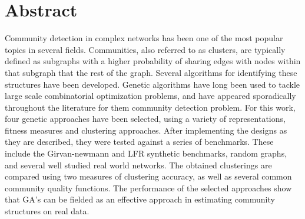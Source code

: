 \thispagestyle{empty}
\section*{Abstract}

\begin{doublespace}
Community detection in complex networks has been one of the most popular topics in several fields. Communities, also referred to as clusters, are typically defined as subgraphs with a higher probability of sharing edges with nodes within that subgraph that the rest of the graph. Several algorithms for identifying these structures have been developed. Genetic algorithms have long been used to tackle large scale combinatorial optimization problems, and have appeared sporadically throughout the literature for them community detection problem. For this work, four genetic approaches have been selected, using a variety of representations, fitness measures and clustering approaches. After implementing the designs as they are described, they were tested against a series of benchmarks. These include the Girvan-newmann and LFR synthetic benchmarks, random graphs, and several well studied real world networks. The obtained clusterings are compared using two measures of clustering accuracy, as well as several common community quality functions. The performance of the selected approaches show that GA's can be fielded as an effective approach in estimating community structures on real data.
\end{doublespace}


